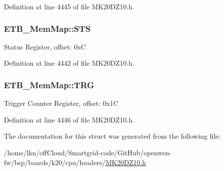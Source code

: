 Definition at line 4445 of file M\+K20\+D\+Z10.\+h.

\subsubsection[{\texorpdfstring{S\+TS}{STS}}]{ E\+T\+B\+\_\+\+Mem\+Map\+::\+S\+TS}\hypertarget{struct_e_t_b___mem_map_a5a471e968aca953fb748c16b10d56939}{}\label{struct_e_t_b___mem_map_a5a471e968aca953fb748c16b10d56939}
Status Register, offset\+: 0xC 

Definition at line 4442 of file M\+K20\+D\+Z10.\+h.

\subsubsection[{\texorpdfstring{T\+RG}{TRG}}]{ E\+T\+B\+\_\+\+Mem\+Map\+::\+T\+RG}\hypertarget{struct_e_t_b___mem_map_a96dc184cb9f6ea6ba7b299b05c58d4ed}{}\label{struct_e_t_b___mem_map_a96dc184cb9f6ea6ba7b299b05c58d4ed}
Trigger Counter Register, offset\+: 0x1C 

Definition at line 4446 of file M\+K20\+D\+Z10.\+h.



The documentation for this struct was generated from the following file\+:\begin{DoxyCompactItemize}
\item 
/home/lkn/off\+Cloud/\+Smartgrid-\/code/\+Git\+Hub/openwsn-\/fw/bsp/boards/k20/cpu/headers/\hyperlink{_m_k20_d_z10_8h}{M\+K20\+D\+Z10.\+h}\end{DoxyCompactItemize}
